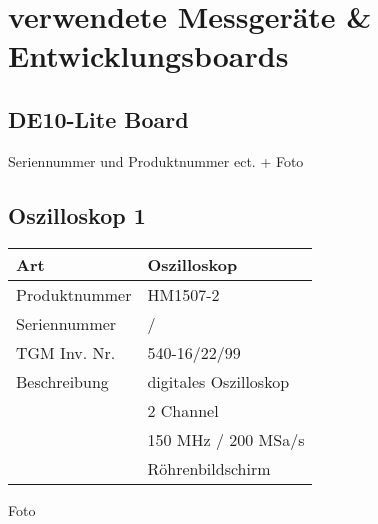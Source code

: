 \section{verwendete Messgeräte \& Entwicklungsboards}
\subsection{DE10-Lite Board}
Seriennummer und Produktnummer ect. + Foto
\subsection{Oszilloskop 1} \label{Oszi1}
\begin{tabular}[h]{l|l}
Art & Oszilloskop\\
\hline
Produktnummer & HM1507-2\\
\hline
Seriennummer & /\\
\hline
TGM Inv. Nr. & 540-16/22/99\\
\hline
Beschreibung & digitales Oszilloskop\\
 & 2 Channel\\
 & 150 MHz / 200 MSa/s\\
 & Röhrenbildschirm\\
\end{tabular}
Foto